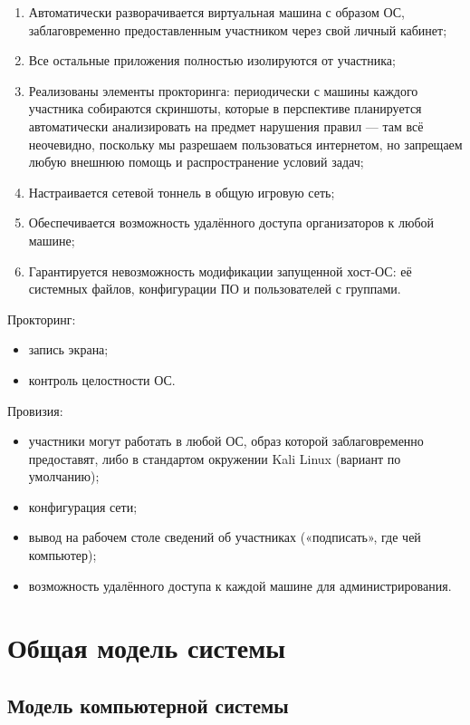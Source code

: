 \begin{enumerate}
\item Автоматически разворачивается виртуальная машина с образом ОС, заблаговременно предоставленным участником через свой личный кабинет;
\item Все остальные приложения полностью изолируются от участника;
\item Реализованы элементы прокторинга: периодически с машины каждого участника собираются скриншоты, которые в перспективе планируется автоматически анализировать на предмет нарушения правил — там всё неочевидно, поскольку мы разрешаем пользоваться интернетом, но запрещаем любую внешнюю помощь и распространение условий задач;
\item Настраивается сетевой тоннель в общую игровую сеть;
\item Обеспечивается возможность удалённого доступа организаторов к любой машине;
\item Гарантируется невозможность модификации запущенной хост-ОС: её системных файлов, конфигурации ПО и пользователей с группами.
\end{enumerate}

Прокторинг:
\begin{itemize}
\item
  запись экрана;
\item
  контроль целостности ОС.
\end{itemize}

Провизия:
\begin{itemize}
\item
  участники могут работать в любой ОС, образ которой заблаговременно предоставят, либо в стандартом окружении Kali Linux (вариант по умолчанию);
\item
  конфигурация сети;
\item
  вывод на рабочем столе сведений об участниках («подписать», где чей компьютер);
\item
  возможность удалённого доступа к каждой машине для администрирования.
\end{itemize}


\section{Общая модель системы}

\subsection{Модель компьютерной системы}


